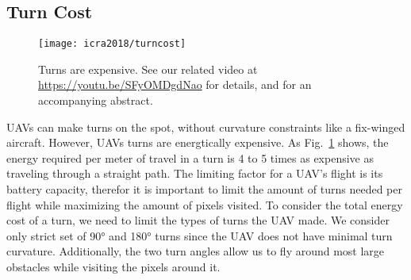 \subsection{Turn Cost}

\begin{figure}[h]
\begin{center}
\texttt{[image: icra2018/turncost]}
\caption[Mosquito hunting drone]{Turns are expensive. See our related video at
\url{https://youtu.be/SFyOMDgdNao} for details, and
\cite{becker2017zapping} for an accompanying abstract.} \label{fig:turncost}
\end{center}
\vspace{-1em}
\end{figure}

UAVs can make turns on the spot, without curvature constraints like a fix-winged aircraft.
However, UAVs turns are energtically expensive.
As Fig.~\ref{fig:turncost} shows, the energy required per meter of travel in a turn is 4 to 5 times as expensive as traveling through a straight path.
The limiting factor for a UAV's flight is its battery capacity, therefor it is important to limit the amount of turns needed per flight while maximizing the amount of pixels visited.
To consider the total energy cost of a turn, we need to limit the types of turns the UAV made.
We consider only strict set of \ang{90} and \ang{180} turns since the UAV does not have minimal turn curvature.
Additionally, the two turn angles allow us to fly around most large obstacles while visiting the pixels around it.



